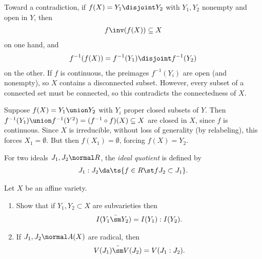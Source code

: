 \begin{solution}[a]

Toward a contradiction, if \(f(X) = Y_1 \disjoint Y_2\) with
\(Y_1, Y_2\) nonempty and open in \(Y\), then
\begin{align*}f\inv(f(X)) \subseteq X\end{align*} on one hand, and
\begin{align*}f^{-1}(f(X)) = f^{-1}(Y_1) \disjoint f^{-1}(Y_2)\end{align*}
on the other. If \(f\) is continuous, the preimages \(f^{-1}(Y_i)\) are
open (and nonempty), so \(X\) contains a disconnected subset. However,
every subset of a connected set must be connected, so this contradicts
the connectedness of \(X\).

\end{solution}

\begin{solution}[b]

Suppose \(f(X) = Y_1 \union Y_2\) with \(Y_i\) proper closed subsets of
\(Y\). Then
\(f^{-1}(Y_1) \union f^{-1}(Y^2) = (f^{-1} \circ f)(X) \subseteq X\) are
closed in \(X\), since \(f\) is continuous. Since \(X\) is irreducible,
without loss of generality (by relabeling), this forces
\(X_1 = \emptyset\). But then \(f(X_1) = \emptyset\), forcing
\(f(X) = Y_2\).

\end{solution}

\begin{definition}

For two ideals \(J_1, J_2\normal R\), the \emph{ideal quotient} is
defined by
\begin{align*}  
J_1 : J_2 \da \ts{f\in R \st fJ_2 \subset J_1}
.\end{align*}

\end{definition}

\begin{exercise}[Gathmann 2.23]

Let \(X\) be an affine variety.

\begin{enumerate}
\def\labelenumi{\alph{enumi}.}
\item
  Show that if \(Y_1, Y_2 \subset X\) are subvarieties then
  \begin{align*}  
  I(\bar{Y_1\sm Y_2}) = I(Y_1): I(Y_2)
  .\end{align*}
\item
  If \(J_1, J_2 \normal A(X)\) are radical, then
  \begin{align*}  
  \bar{V(J_1) \sm V(J_2)} = V(J_1: J_2)
  .\end{align*}
\end{enumerate}

\end{exercise}

